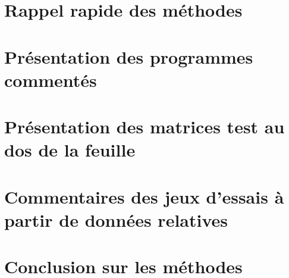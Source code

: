 \documentclass[letter]{article}
\date{\today}
\title{}
\begin{document}





\setcounter{tocdepth}{2}
\tableofcontents

\section{Rappel rapide des méthodes}
\label{sec:org7794d8c}

\section{Présentation des programmes commentés}
\label{sec:orgebb5fbf}

\section{Présentation des matrices test au dos de la feuille}
\label{sec:orgec12617}

\section{Commentaires des jeux d'essais à partir de données relatives}
\label{sec:orgf28260e}

\section{Conclusion sur les méthodes}
\label{sec:org13855c9}
\end{document}
